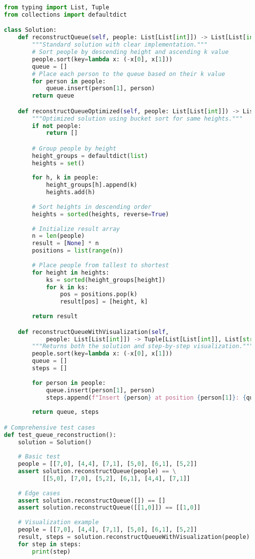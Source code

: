 \begin{fullwidth}
\begin{lstlisting}[language=Python]
from typing import List, Tuple
from collections import defaultdict

class Solution:
    def reconstructQueue(self, people: List[List[int]]) -> List[List[int]]:
        """Standard solution with clear implementation."""
        # Sort people by descending height and ascending k value
        people.sort(key=lambda x: (-x[0], x[1]))
        queue = []
        # Place each person to the queue based on their k value
        for person in people:
            queue.insert(person[1], person)
        return queue

    def reconstructQueueOptimized(self, people: List[List[int]]) -> List[List[int]]:
        """Optimized solution using bucket sort for same heights."""
        if not people:
            return []

        # Group people by height
        height_groups = defaultdict(list)
        heights = set()
        
        for h, k in people:
            height_groups[h].append(k)
            heights.add(h)
        
        # Sort heights in descending order
        heights = sorted(heights, reverse=True)
        
        # Initialize result array
        n = len(people)
        result = [None] * n
        positions = list(range(n))
        
        # Place people from tallest to shortest
        for height in heights:
            ks = sorted(height_groups[height])
            for k in ks:
                pos = positions.pop(k)
                result[pos] = [height, k]
        
        return result

    def reconstructQueueWithVisualization(self, 
            people: List[List[int]]) -> Tuple[List[List[int]], List[str]]:
        """Returns both the solution and step-by-step visualization."""
        people.sort(key=lambda x: (-x[0], x[1]))
        queue = []
        steps = []
        
        for person in people:
            queue.insert(person[1], person)
            steps.append(f"Insert {person} at position {person[1]}: {queue}")
            
        return queue, steps

# Comprehensive test cases
def test_queue_reconstruction():
    solution = Solution()
    
    # Basic test
    people = [[7,0], [4,4], [7,1], [5,0], [6,1], [5,2]]
    assert solution.reconstructQueue(people) == \
           [[5,0], [7,0], [5,2], [6,1], [4,4], [7,1]]
    
    # Edge cases
    assert solution.reconstructQueue([]) == []
    assert solution.reconstructQueue([[1,0]]) == [[1,0]]
    
    # Visualization example
    people = [[7,0], [4,4], [7,1], [5,0], [6,1], [5,2]]
    result, steps = solution.reconstructQueueWithVisualization(people)
    for step in steps:
        print(step)
\end{lstlisting}
\end{fullwidth}

